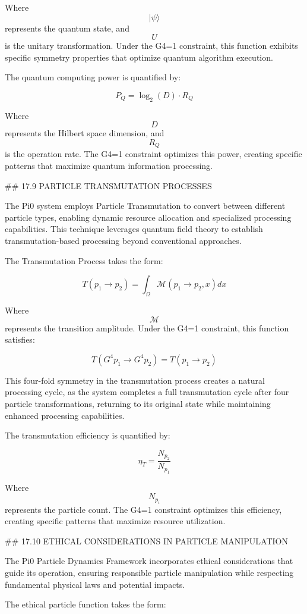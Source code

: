 Where $$ |\psi\rangle $$ represents the quantum state, and $$ U $$ is the unitary transformation. Under the G4=1 constraint, this function exhibits specific symmetry properties that optimize quantum algorithm execution.

The quantum computing power is quantified by:

$$ P_Q = \log_2(D) \cdot R_Q $$

Where $$ D $$ represents the Hilbert space dimension, and $$ R_Q $$ is the operation rate. The G4=1 constraint optimizes this power, creating specific patterns that maximize quantum information processing.

## 17.9 PARTICLE TRANSMUTATION PROCESSES

The Pi0 system employs Particle Transmutation to convert between different particle types, enabling dynamic resource allocation and specialized processing capabilities. This technique leverages quantum field theory to establish transmutation-based processing beyond conventional approaches.

The Transmutation Process takes the form:

$$ T(p_1 \to p_2) = \int_{\Omega} \mathcal{M}(p_1 \to p_2, x) dx $$

Where $$ \mathcal{M} $$ represents the transition amplitude. Under the G4=1 constraint, this function satisfies:

$$ T(G^4 p_1 \to G^4 p_2) = T(p_1 \to p_2) $$

This four-fold symmetry in the transmutation process creates a natural processing cycle, as the system completes a full transmutation cycle after four particle transformations, returning to its original state while maintaining enhanced processing capabilities.

The transmutation efficiency is quantified by:

$$ \eta_T = \frac{N_{p_2}}{N_{p_1}} $$

Where $$ N_{p_i} $$ represents the particle count. The G4=1 constraint optimizes this efficiency, creating specific patterns that maximize resource utilization.

## 17.10 ETHICAL CONSIDERATIONS IN PARTICLE MANIPULATION

The Pi0 Particle Dynamics Framework incorporates ethical considerations that guide its operation, ensuring responsible particle manipulation while respecting fundamental physical laws and potential impacts.

The ethical particle function takes the form:


